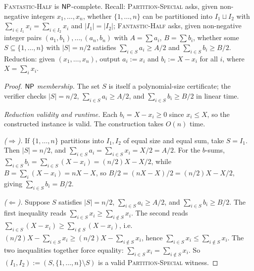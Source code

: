 \begin{theorem}
\label{thm:partspec_to_fh}
\textsc{Fantastic-Half} is $\mathsf{NP}$-complete. Recall: \textsc{Partition-Special} asks, given non-negative integers $x_1, \dots, x_n$, whether $\{1, \dots, n\}$ can be partitioned into $I_1 \sqcup I_2$ with $\sum_{i \in I_1} x_i = \sum_{i \in I_2} x_i$ and $|I_1| = |I_2|$; \textsc{Fantastic-Half} asks, given non-negative integer pairs $(a_1, b_1), \dots, (a_n, b_n)$ with $A = \sum a_i$, $B = \sum b_i$, whether some $S \subseteq \{1, \dots, n\}$ with $|S| = n/2$ satisfies $\sum_{i \in S} a_i \ge A/2$ and $\sum_{i \in S} b_i \ge B/2$. Reduction: given $(x_1, \dots, x_n)$, output $a_i := x_i$ and $b_i := X - x_i$ for all $i$, where $X = \sum_i x_i$.
\end{theorem}

\begin{proof}
\textit{$\mathsf{NP}$ membership.} The set $S$ is itself a polynomial-size certificate; the verifier checks $|S| = n/2$, $\sum_{i \in S} a_i \ge A/2$, and $\sum_{i \in S} b_i \ge B/2$ in linear time.

\medskip
\noindent\textit{Reduction validity and runtime.} Each $b_i = X - x_i \ge 0$ since $x_i \le X$, so the constructed instance is valid. The construction takes $O(n)$ time.

\medskip
\noindent\textit{($\Rightarrow$).} If $\{1, \dots, n\}$ partitions into $I_1, I_2$ of equal size and equal sum, take $S = I_1$. Then $|S| = n/2$, and $\sum_{i \in S} a_i = \sum_{i \in S} x_i = X/2 = A/2$. For the $b$-sums, $\sum_{i \in S} b_i = \sum_{i \in S} (X - x_i) = (n/2) X - X/2$, while $B = \sum_i (X - x_i) = nX - X$, so $B/2 = (nX - X)/2 = (n/2) X - X/2$, giving $\sum_{i \in S} b_i = B/2$.

\medskip
\noindent\textit{($\Leftarrow$).} Suppose $S$ satisfies $|S| = n/2$, $\sum_{i \in S} a_i \ge A/2$, and $\sum_{i \in S} b_i \ge B/2$. The first inequality reads $\sum_{i \in S} x_i \ge \sum_{i \notin S} x_i$. The second reads $\sum_{i \in S}(X - x_i) \ge \sum_{i \notin S}(X - x_i)$, i.e.\ $(n/2) X - \sum_{i \in S} x_i \ge (n/2) X - \sum_{i \notin S} x_i$, hence $\sum_{i \in S} x_i \le \sum_{i \notin S} x_i$. The two inequalities together force equality: $\sum_{i \in S} x_i = \sum_{i \notin S} x_i$. So $(I_1, I_2) := (S, \{1, \dots, n\} \setminus S)$ is a valid \textsc{Partition-Special} witness.
\end{proof}

